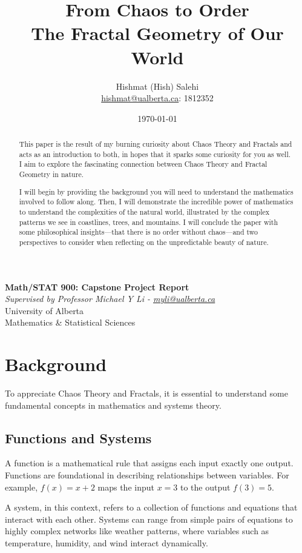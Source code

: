 \documentclass[12pt]{article}
\title{From Chaos to Order\\
       \large The Fractal Geometry of Our World}
\author{Hishmat (Hish) Salehi \\
\href{mailto:hishmat@ualberta.ca}{hishmat@ualberta.ca}: 1812352}
\date{\today}
\begin{document}
\maketitle

\begin{center}
\textbf{Math/STAT 900: Capstone Project Report}  \\
\emph{Supervised by Professor Michael Y Li - 
\href{mailto:myli@ualberta.ca}{myli@ualberta.ca}}  \\
University of Alberta \\
Mathematics \& Statistical Sciences
\end{center}

\begin{abstract}
This paper is the result of my burning curiosity about Chaos Theory and Fractals and acts as an introduction to both, in hopes that it sparks some curiosity for you as well. I aim to explore the fascinating connection between Chaos Theory and Fractal Geometry in nature. 

I will begin by providing the background you will need to understand the mathematics involved to follow along. Then, I will demonstrate the incredible power of mathematics to understand the complexities of the natural world, illustrated by the complex patterns we see in coastlines, trees, and mountains. I will conclude the paper with some philosophical insights—that there is no order without chaos—and two perspectives to consider when reflecting on the unpredictable beauty of nature.
\end{abstract}

\newpage

\tableofcontents

\section{Background}
To appreciate Chaos Theory and Fractals, it is essential to understand some fundamental concepts in mathematics and systems theory.

\subsection{Functions and Systems}
A function is a mathematical rule that assigns each input exactly one output. Functions are foundational in describing relationships between variables. For example, \( f(x) = x + 2 \) maps the input \( x = 3 \) to the output \( f(3) = 5 \).

A system, in this context, refers to a collection of functions and equations that interact with each other. Systems can range from simple pairs of equations to highly complex networks like weather patterns, where variables such as temperature, humidity, and wind interact dynamically.
\end{document}
